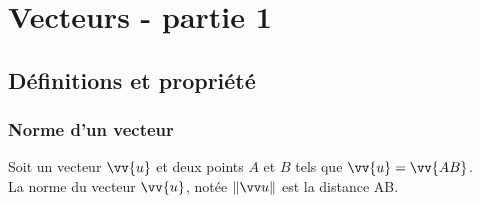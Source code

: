 \chapter{Vecteurs - partie 1}
\thispagestyle{fancy}

\section{Définitions et propriété}

\subsection{Norme d'un vecteur}

    \begin{bdefi}
        Soit un vecteur $\vv{u}$ et deux points $A$ et $B$ tels que $\vv{u}=\vv{AB}$.\\
        La norme du vecteur $\vv{u}$, notée $\normeB{u}$ est la distance AB.	
    \end{bdefi}
    
